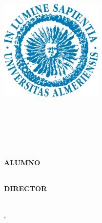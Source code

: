\title{\titulo}
\author{\autor}
\date{\fecha}

\begin{titlepage}
    \begin{center}
    
        {\Large \bf \tipoTesis}\\
        \vspace{1cm}
        {\Large \normalfont \bfseries \titulo}\\ 
        
        \vspace{1.5 cm}
        \includegraphics[height=5cm]{logo.png}
        \vspace{1.5 cm}
        
        {\Large \bf \universidad}\\
        \vspace{2mm}
        {\Large \bf \escuela}\\
        \vspace{2cm}
        
        {\bf \master}\\
        {\bf \especialidad}\\
        \vspace{2cm}
        
        {\bf ALUMNO}\\
        {\large \autor}\\
        \vspace{0cm}
        
        {\bf DIRECTOR}\\
        {\large \director}\\
        \vspace{2cm}
        
        {\ciudad, \fecha}
    \end{center}
\end{titlepage}